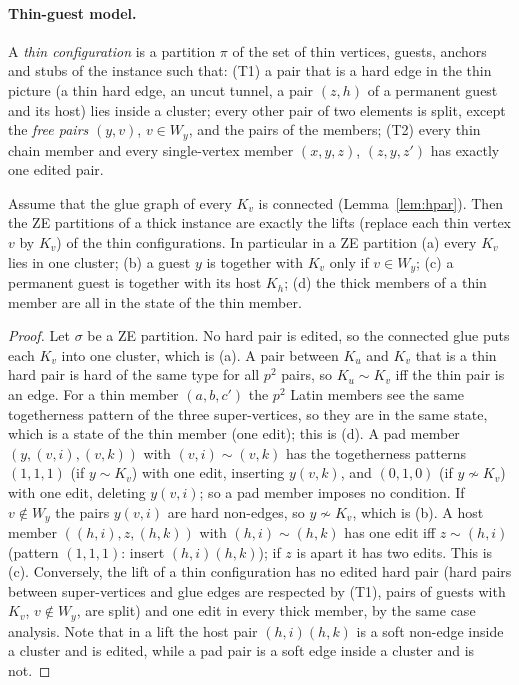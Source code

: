 \paragraph{Thin-guest model.} A \emph{thin configuration} is a partition $\pi$ of the set of thin vertices, guests, anchors and stubs of the instance such that: (T1) a pair that is a hard edge in the thin picture (a thin hard edge, an uncut tunnel, a pair $(z,h)$ of a permanent guest and its host) lies inside a cluster; every other pair of two elements is split, except the \emph{free pairs} $(y,v)$, $v\in W_y$, and the pairs of the members; (T2) every thin chain member and every single-vertex member $(x,y,z)$, $(z,y,z')$ has exactly one edited pair.

\begin{lemma}[Blow-up]\label{lem:hblow}
Assume that the glue graph of every $K_v$ is connected (Lemma~\ref{lem:hpar}). Then the ZE partitions of a thick instance are exactly the lifts (replace each thin vertex $v$ by $K_v$) of the thin configurations. In particular in a ZE partition (a) every $K_v$ lies in one cluster; (b) a guest $y$ is together with $K_v$ only if $v\in W_y$; (c) a permanent guest is together with its host $K_h$; (d) the thick members of a thin member are all in the state of the thin member.
\end{lemma}
\begin{proof}
Let $\sigma$ be a ZE partition. No hard pair is edited, so the connected glue puts each $K_v$ into one cluster, which is (a). A pair between $K_u$ and $K_v$ that is a thin hard pair is hard of the same type for all $p^2$ pairs, so $K_u\sim K_v$ iff the thin pair is an edge. For a thin member $(a,b,c')$ the $p^2$ Latin members see the same togetherness pattern of the three super-vertices, so they are in the same state, which is a state of the thin member (one edit); this is (d). A pad member $(y,(v,i),(v,k))$ with $(v,i)\sim(v,k)$ has the togetherness patterns $(1,1,1)$ (if $y\sim K_v$) with one edit, inserting $y(v,k)$, and $(0,1,0)$ (if $y\not\sim K_v$) with one edit, deleting $y(v,i)$; so a pad member imposes no condition. If $v\notin W_y$ the pairs $y(v,i)$ are hard non-edges, so $y\not\sim K_v$, which is (b). A host member $((h,i),z,(h,k))$ with $(h,i)\sim(h,k)$ has one edit iff $z\sim(h,i)$ (pattern $(1,1,1)$: insert $(h,i)(h,k)$); if $z$ is apart it has two edits. This is (c). Conversely, the lift of a thin configuration has no edited hard pair (hard pairs between super-vertices and glue edges are respected by (T1), pairs of guests with $K_v$, $v\notin W_y$, are split) and one edit in every thick member, by the same case analysis. Note that in a lift the host pair $(h,i)(h,k)$ is a soft non-edge inside a cluster and is edited, while a pad pair is a soft edge inside a cluster and is not.
\end{proof}

